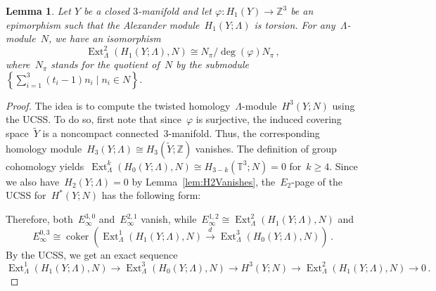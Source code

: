\documentclass[10.9pt,a4paper]{amsart}
\newtheorem{lemma}[theorem]{Lemma}
\theoremstyle{definition}
\theoremstyle{remark}
\newcommand{\Z}{\mathbb{Z}}
\newcommand{\coker}{\operatorname{coker}}
\newcommand{\Ext}{\operatorname{Ext}}
\begin{document}
\begin{lemma}
\label{lem:Ext-N}
Let $Y$ be a closed $3$-manifold and let $\varphi \colon H_1(Y) \to \Z^3$ be an epimorphism such that the Alexander module~$H_1(Y;\Lambda)$ is torsion.
For any~$\Lambda$-module~$N$, we have an isomorphism
\[
\Ext^2_\Lambda(H_1(Y;\Lambda),N)\cong N_\pi/\deg(\varphi) N_\pi\,,
\]
where~$N_\pi$ stands for the quotient of~$N$ by the submodule~$\left\{\sum_{i=1}^3(t_i-1)n_i\mid n_i\in N\right\}$.
\end{lemma}
\begin{proof}
The idea is to compute the twisted homology~$\Lambda$-module~$H^3(Y;N)$ using the UCSS.
To do so, first note that since~$\varphi$ is surjective, the induced covering space~$\widetilde{Y}$ is a noncompact
connected~$3$-manifold. 
Thus, the corresponding homology module~$H_3(Y;\Lambda)\cong H_3(\widetilde{Y};\Z)$ vanishes.
The definition of group cohomology yields~$\Ext^k_\Lambda(H_0(Y;\Lambda),N)\cong H_{3-k}(\mathbb{T}^3;N)=0$
for~$k\ge 4$.
Since we also have~$H_2(Y;\Lambda)=0$ by Lemma~\ref{lem:H2Vanishes}, the~$E_2$-page of the UCSS for~$H^*(Y;N)$ has the following form:
\begin{center}
\end{center}
Therefore, both~$E_\infty^{3,0}$ and~$E_\infty^{2,1}$ vanish, while~$E_\infty^{1,2}\cong\Ext_\Lambda^2(H_1(Y;\Lambda),N)$ and
\[
E_\infty^{0,3}\cong\coker\left(\Ext^1_\Lambda(H_1(Y;\Lambda),N)\stackrel{d}{\longrightarrow}\Ext^3_\Lambda(H_0(Y;\Lambda),N)\right)\,.
\]
By the UCSS, we get an exact sequence
\[
\Ext^1_\Lambda(H_1(Y;\Lambda),N)\longrightarrow\Ext^3_\Lambda(H_0(Y;\Lambda),N)\longrightarrow H^3(Y;N)\longrightarrow\Ext^2_\Lambda(H_1(Y;\Lambda),N)\longrightarrow0\,.
\]


\end{proof}
\end{document}
